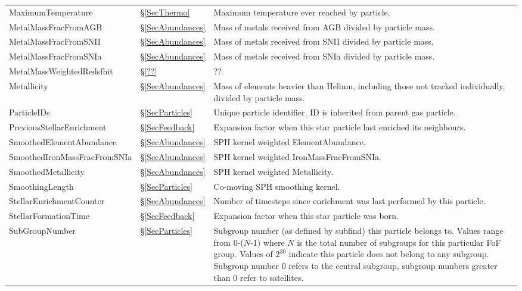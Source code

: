 \documentclass[10pt, a4paper]{article}
\newcommand{\subgroupnumber}{Subgroup number (as defined by {\sc subfind}) this
particle belongs to. Values range from 0-($N$-1) where $N$ is the total number
of subgroups for this particular FoF group. Values of $2^{30}$ indicate this
particle does not belong to any subgroup. Subgroup number 0 refers to the
central subgroup, subgroup numbers greater than 0 refer to satellites.}
\begin{document}
\begin{table}
\begin{center}
\begin{tabular}{>{\ttfamily}p{4cm}p{1.5cm}p{11cm}}
MaximumTemperature &
\S\ref{SecThermo} & Maximum temperature ever reached by particle. \\

MetalMassFracFromAGB &
\S\ref{SecAbundances} &
Mass of metals received from AGB divided by particle mass. \\

MetalMassFracFromSNII &
\S\ref{SecAbundances}  &
Mass of metals received from SNII divided by particle mass. \\

MetalMassFracFromSNIa &
\S\ref{SecAbundances}  &
Mass of metals received from SNIa divided by particle mass. \\

MetalMassWeightedRedsfhit &
\S\ref{??} &
?? \\

Metallicity &
\S\ref{SecAbundances}  & Mass of elements heavier than Helium, including
those not tracked individually,  divided by particle mass. \\

ParticleIDs &
\S\ref{SecParticles} &
Unique particle identifier. ID is inherited from parent gas particle. \\

PreviousStellarEnrichment &
\S\ref{SecFeedback} &
Expansion factor when this star particle last enriched its neighbours. \\

SmoothedElementAbundance &
\S\ref{SecAbundances}  &
SPH kernel weighted ElementAbundance. \\

SmoothedIronMassFracFromSNIa &
\S\ref{SecAbundances}  &
SPH kernel weighted IronMassFracFromSNIa. \\

SmoothedMetallicity &
\S\ref{SecAbundances}  &
SPH kernel weighted Metallicity. \\

SmoothingLength &
\S\ref{SecParticles} &
Co-moving SPH smoothing kernel. \\

StellarEnrichmentCounter &
\S\ref{SecAbundances}  &
Number of timesteps since enrichment was last performed by this particle. \\

StellarFormationTime &
\S\ref{SecFeedback} &
Expansion factor when this star particle was born. \\

SubGroupNumber &
\S\ref{SecParticles} &
\subgroupnumber \\


\end{tabular}
\end{center}
\end{table}
\end{document}
